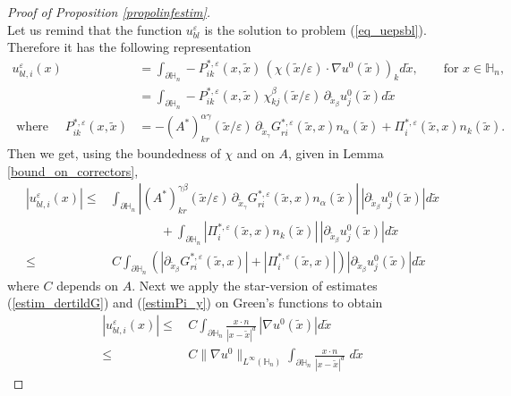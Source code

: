 \documentclass[11pt, reqno]{amsart}
\theoremstyle{definition}
\theoremstyle{remark}
\numberwithin{equation}{section}
\begin{document}
\begin{proof}[Proof of Proposition \textup{\ref{propolinfestim}}]
		\\
		Let us remind that the function $u_{bl}^\varepsilon$ is the solution to problem (\ref{eq_uepsbl}). Therefore it has the following representation   
		\begin{align*}
			u^\varepsilon_{bl,i} (x)&= \int_{\partial\mathbb{H}_n} -P_{ik}^{*,\varepsilon} (x,\tilde{x})\,\left(\chi (\tilde{x}/ \varepsilon) \cdot\nabla u^0 (\tilde{x})\right)_k  d\tilde{x},\qquad \mbox{for }x\in\mathbb{H}_n,\\
			&= \int_{\partial\mathbb{H}_n} -P_{ik}^{*,\varepsilon} (x,\tilde{x})\,\chi^\beta_{kj} (\tilde{x}/ \varepsilon) \,\partial_{\tilde{x}_\beta} u_j^0 (\tilde{x})  d\tilde{x}\\
			\mbox{ where }\quad 	P_{ik}^{*,\varepsilon} (x,\tilde{x})
			&=-(A^*)_{kr}^{\alpha\gamma}(\tilde{x}/\varepsilon)\, \partial_{\tilde{x}_\gamma}G_{ri}^{*,\varepsilon}(\tilde{x},x) n_\alpha (\tilde{x})+  \Pi_i^{*,\varepsilon}(\tilde{x},x) n_k(\tilde{x}).
		\end{align*}
		Then we get, using the boundedness of $\chi$ and on $A$,	given in Lemma \ref{bound_on_correctors},
		\begin{align*}
			|	u^\varepsilon_{bl,i} (x)|
			\leq& \int_{\partial\mathbb{H}_n} \left| (A^*)_{kr}^{\gamma\beta}(\tilde{x}/\varepsilon)\, \partial_{\tilde{x}_\gamma}G_{ri}^{*,\varepsilon}(\tilde{x},x) n_\alpha (\tilde{x})\right|\,| \partial_{\tilde{x}_\beta} u_j^0 (\tilde{x})| d\tilde{x}\\
			&\qquad\qquad  + \int_{\partial\mathbb{H}_n} \left| \Pi_i^{*,\varepsilon}(\tilde{x},x) n_k(\tilde{x})\right|\,|\partial_{\tilde{x}_\beta} u_j^0 (\tilde{x})| d\tilde{x}  \\
			\leq&\, C\int_{\partial\mathbb{H}_n} \left(\left|  \partial_{\tilde{x}_\beta}G_{ri}^{*,\varepsilon}(\tilde{x},x)\right|+\left| \Pi_i^{*,\varepsilon}(\tilde{x},x)\right|\right) | \partial_{\tilde{x}_\beta} u_j^0 (\tilde{x})| d\tilde{x} 
		\end{align*}	where $C$ depends on $A$.
		Next we apply the star-version of estimates (\ref{estim_dertildG}) and (\ref{estimPi_y}) on Green's functions to obtain
		\begin{align}
			|	u^\varepsilon_{bl,i} (x)|\leq& \, C\int_{\partial\mathbb{H}_n}  \frac{x\cdot n}{|x-\tilde{x}|^d} \, |\nabla u^0 (\tilde{x})| d\tilde{x}\nonumber\\
			\leq& \, C  \|\nabla u^0 \|_{L^\infty(\mathbb{H}_n)} \int_{\partial\mathbb{H}_n}  \frac{x\cdot n}{|x-\tilde{x}|^d} \, \,  d\tilde{x} \label{3bounduepsbl}

\end{align}
\end{proof}
\end{document}
